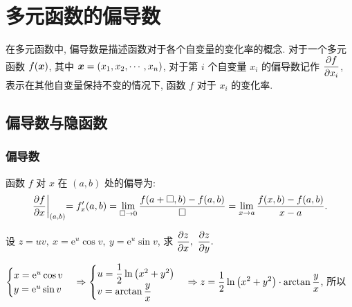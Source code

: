 \section{多元函数的偏导数}

在多元函数中, 偏导数是描述函数对于各个自变量的变化率的概念.
对于一个多元函数 $f(\vb*{x})$, 其中 $\vb*{x}=(x_1,x_2,\cdots,x_n)$, 对于第 $i$ 个自变量 $x_i$ 的偏导数记作 $\displaystyle\pdv{f}{x_i}$,
表示在其他自变量保持不变的情况下, 函数 $f$ 对于 $x_i$ 的变化率.

\subsection{偏导数与隐函数}

\subsubsection{偏导数}

\begin{definition}[偏导数]
    函数 $f$ 对 $x$ 在 $(a,b)$ 处的偏导为:
    $$\displaystyle \pdv{f}{x}\biggl |_{(a,b)}=f'_x(a,b)=\lim_{\Box\to0}\dfrac{f(a+\Box,b)-f(a,b)}{\Box}=\lim_{x\to a}\dfrac{f(x,b)-f(a,b)}{x-a}.$$
\end{definition}

\begin{example}
    设 $z=uv,~x=\mathrm{e}^u\cos v,~y=\mathrm{e}^u\sin v$, 求 $\displaystyle \pdv{z}{x},~\pdv{z}{y}.$
\end{example}
\begin{solution}
    $\displaystyle\begin{cases}
            x=\mathrm{e}^u\cos v \\
            y=\mathrm{e}^u\sin v
        \end{cases}\Rightarrow
        \begin{cases}
            u=\dfrac{1}{2}\ln\qty(x^2+y^2) \\
            v=\arctan \dfrac{y}{x}
        \end{cases}\Rightarrow z=\dfrac{1}{2}\ln\qty(x^2+y^2)\cdot\arctan\dfrac{y}{x}$, 所以
\end{solution}

